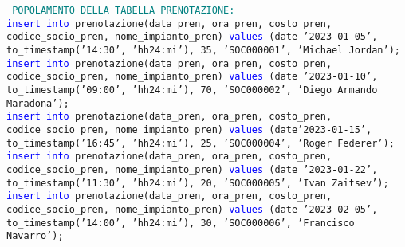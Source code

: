 \documentclass{article}
\begin{document}
    \begin{flushleft}
        \texttt{
        \textcolor{teal}{POPOLAMENTO DELLA TABELLA PRENOTAZIONE:} \\
        \hspace*{0.5em}\textcolor{blue}{insert into} prenotazione(data\_pren, ora\_pren, costo\_pren, codice\_socio\_pren, \hspace*{0.5em}nome\_impianto\_pren) \textcolor{blue}{values} (date '2023-01-05', to\_timestamp('14:30', 'hh24:mi'), \hspace*{0.5em}35, 'SOC000001', 'Michael Jordan'); \\
        \vspace{2mm}
        \hspace*{0.5em}\textcolor{blue}{insert into} prenotazione(data\_pren, ora\_pren, costo\_pren, codice\_socio\_pren, \hspace*{0.5em}nome\_impianto\_pren) \textcolor{blue}{values} (date '2023-01-10', to\_timestamp('09:00', 'hh24:mi'), \hspace*{0.5em}70, 'SOC000002', 'Diego Armando Maradona'); \\
        \vspace{2mm}
        \hspace*{0.5em}\textcolor{blue}{insert into} prenotazione(data\_pren, ora\_pren, costo\_pren, codice\_socio\_pren, \hspace*{0.5em}nome\_impianto\_pren) \textcolor{blue}{values} (date'2023-01-15', to\_timestamp('16:45', 'hh24:mi'), \hspace*{0.5em}25, 'SOC000004', 'Roger Federer'); \\
        \vspace{2mm}
        \hspace*{0.5em}\textcolor{blue}{insert into} prenotazione(data\_pren, ora\_pren, costo\_pren, codice\_socio\_pren, \hspace*{0.5em}nome\_impianto\_pren) \textcolor{blue}{values} (date '2023-01-22', to\_timestamp('11:30', 'hh24:mi'), \hspace*{0.5em}20, 'SOC000005', 'Ivan Zaitsev'); \\
        \vspace{2mm}
        \hspace*{0.5em}\textcolor{blue}{insert into} prenotazione(data\_pren, ora\_pren, costo\_pren, codice\_socio\_pren, \hspace*{0.5em}nome\_impianto\_pren) \textcolor{blue}{values} (date '2023-02-05', to\_timestamp('14:00', 'hh24:mi'), \hspace*{0.5em}30, 'SOC000006', 'Francisco Navarro'); \\
}
\end{flushleft}
\end{document}
